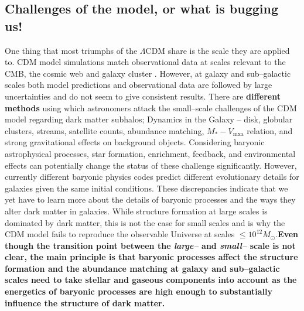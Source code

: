 \documentclass[paper=a4, fontsize=11pt]{scrartcl} %
\numberwithin{equation}{section} %
\numberwithin{figure}{section} %
\numberwithin{table}{section} %
\begin{document}
\subsection{Challenges of the model, or what is bugging us!}
\label{subsec:LCDM_challenges}
One thing that most triumphs of the $\Lambda$CDM share is the scale they are applied to. CDM model simulations match observational data at scales relevant to the CMB, the cosmic web and galaxy cluster \citep[however, see e.g. \citet{Guo+2011}][ {\bf and more} pointing out large--scale discrepancies in the $\Lambda$CDM model]{}. However, at galaxy and sub--galactic scales both model predictions and observational data are followed by large uncertainties and do not seem to give consistent results. There are {\bf different methods} using which astronomers attack the small--scale challenges of the CDM model regarding dark matter subhalos; Dynamics in the Galaxy -- disk, globular clusters, streams, satellite counts, abundance matching, $M_* - V_\mathrm{mxa}$ relation, and strong gravitational effects on background objects. Considering baryonic astrophysical processes, star formation, enrichment, feedback, and environmental effects can potentially change the status of these challenge significantly. However, currently different baryonic physics codes predict different evolutionary details for galaxies given the same initial conditions. These discrepancies indicate that we yet have to learn more about the details of baryonic processes and the ways they alter dark matter in galaxies. While structure formation at large scales is dominated by dark matter, this is not the case for small scales and is why the CDM model fails to reproduce the observable Universe at scales $\leq 10^{12} M_\odot$.{\bf Even though the transition point between the \emph{large--} and \emph{small--} scale is not clear, the main principle is that baryonic processes affect the structure formation and the abundance matching at galaxy and sub--galactic scales need to take stellar and gaseous components into account as the energetics of baryonic processes are high enough to substantially influence the structure of dark matter.}
\end{document}
